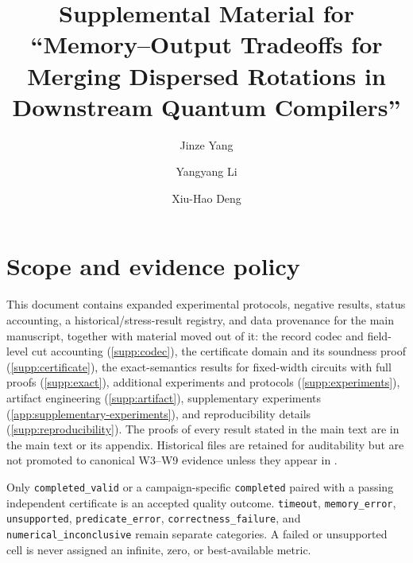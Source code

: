 \documentclass[a4paper,onecolumn,10pt,unpublished]{quantumarticle}
\begin{document}
\title{Supplemental Material for ``Memory--Output Tradeoffs for Merging
Dispersed Rotations in Downstream Quantum Compilers''}
\author{Jinze Yang}
\author{Yangyang Li}
\author{Xiu-Hao Deng}
\date{}
\maketitle

\section{Scope and evidence policy}
\label{supp:scope}

This document contains expanded experimental protocols, negative results,
status accounting, a historical/stress-result registry, and data provenance
for the main manuscript, together with material moved out of it: the record
codec and field-level cut accounting (\cref{supp:codec}), the certificate
domain and its soundness proof (\cref{supp:certificate}), the
exact-semantics results for fixed-width circuits with full proofs
(\cref{supp:exact}), additional experiments and protocols
(\cref{supp:experiments}), artifact engineering (\cref{supp:artifact}),
supplementary experiments (\cref{app:supplementary-experiments}), and
reproducibility details (\cref{supp:reproducibility}).  The proofs of every
result stated in the main text are in the main text or its appendix.
Historical files
are retained for auditability but are not promoted to canonical W3--W9
evidence unless they appear in
.

\begin{sloppypar}
Only \texttt{completed\_valid} or a campaign-specific \texttt{completed}
paired with a passing independent certificate is an accepted quality outcome.
\texttt{timeout}, \texttt{memory\_error}, \texttt{unsupported},
\texttt{predicate\_error}, \texttt{correctness\_failure}, and
\texttt{numerical\_inconclusive} remain separate categories.  A failed or
unsupported cell is never assigned an infinite, zero, or best-available
metric.
\end{sloppypar}
\end{document}

